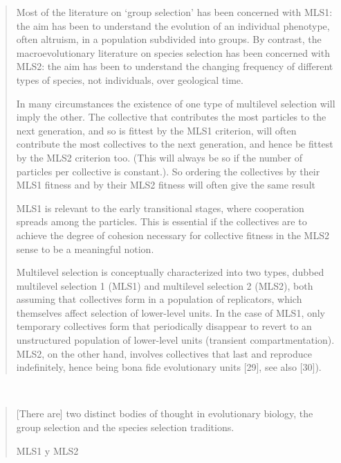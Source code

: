 \documentclass[a4paper,10pt]{article}
\begin{document}
\begin{quotation}
    Most of the literature on ‘group selection’ has been concerned with MLS1: the aim has been to understand the evolution of an individual phenotype, often altruism, in a population subdivided into groups.
    By contrast, the macroevolutionary literature on species selection has been concerned with MLS2: the aim has been to understand the changing frequency of different types of species, not individuals, over geological time.
    
    In many circumstances the existence of one type of multilevel selection will imply the other.
    The collective that contributes the most particles to the next generation, and so is fittest by the MLS1 criterion, will often contribute the most collectives to the next generation, and hence be fittest by the MLS2 criterion too.
    (This will always be so if the number of particles per collective is constant.).
    So ordering the collectives by their MLS1 fitness and by their MLS2 fitness will often give the same result
    
    MLS1 is relevant to the early transitional stages, where cooperation spreads among the particles.
    This is essential if the collectives are to achieve the degree of cohesion necessary for collective fitness in the MLS2 sense to be a meaningful notion.
    
    Multilevel selection is conceptually characterized into two types, dubbed multilevel selection 1 (MLS1) and multilevel selection 2 (MLS2), both assuming that collectives form in a population of replicators, which themselves affect selection of lower-level units.
    In the case of MLS1, only temporary collectives form that periodically disappear to revert to an unstructured population of lower-level units (transient compartmentation).
    MLS2, on the other hand, involves collectives that last and reproduce indefinitely, hence being bona fide evolutionary units [29], see also [30]).
    
\end{quotation}

\\

\begin{quotation} \cite{damuth1988-multilevelSelection}
    [There are] two distinct bodies of thought in evolutionary biology, the group selection and the species selection traditions.

MLS1 y MLS2
\end{quotation}

 \\
 
\end{document}
